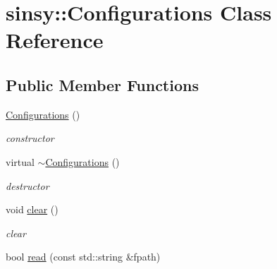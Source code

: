 \hypertarget{classsinsy_1_1Configurations}{\section{sinsy\-:\-:\-Configurations \-Class \-Reference}
\label{classsinsy_1_1Configurations}
}
\subsection*{\-Public \-Member \-Functions}
\begin{DoxyCompactItemize}
\item 
\hypertarget{classsinsy_1_1Configurations_ae8bdd24e3f76262c0aa3518ceabc4731}{\hyperlink{classsinsy_1_1Configurations_ae8bdd24e3f76262c0aa3518ceabc4731}{\-Configurations} ()}\label{classsinsy_1_1Configurations_ae8bdd24e3f76262c0aa3518ceabc4731}

\begin{DoxyCompactList}\small\item\em constructor \end{DoxyCompactList}\item 
\hypertarget{classsinsy_1_1Configurations_ab936418c05ff482a0da4963148cbb264}{virtual \hyperlink{classsinsy_1_1Configurations_ab936418c05ff482a0da4963148cbb264}{$\sim$\-Configurations} ()}\label{classsinsy_1_1Configurations_ab936418c05ff482a0da4963148cbb264}

\begin{DoxyCompactList}\small\item\em destructor \end{DoxyCompactList}\item 
\hypertarget{classsinsy_1_1Configurations_a15db5511620326d0daadf2d8d584f070}{void \hyperlink{classsinsy_1_1Configurations_a15db5511620326d0daadf2d8d584f070}{clear} ()}\label{classsinsy_1_1Configurations_a15db5511620326d0daadf2d8d584f070}

\begin{DoxyCompactList}\small\item\em clear \end{DoxyCompactList}\item 
\hypertarget{classsinsy_1_1Configurations_ad58be2d0caca2befe358ce443717c11b}{bool \hyperlink{classsinsy_1_1Configurations_ad58be2d0caca2befe358ce443717c11b}{read} (const std\-::string \&fpath)}\label{classsinsy_1_1Configurations_ad58be2d0caca2befe358ce443717c11b}


\end{DoxyCompactItemize}

